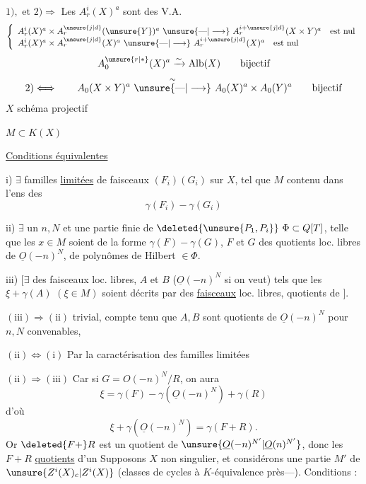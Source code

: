 $1),\text{ et }2)\Longrightarrow$ Les $A_r^i(X)^a$ sont des V.A.
\[
\left\{
\begin{array}{l}
A_r^i(X)^a\times A_r^{\unsure{j|d}}(\unsure{Y})^a\ \unsure{\text{---}|\longrightarrow}\ A_r^{i+\unsure{j|d}}(X\times Y)^a\quad\text{est nul}\\
A_r^i(X)^a\times A_r^{\unsure{j|d}}(X)^a\ \unsure{\text{---}|\longrightarrow}\ A_r^{i+\unsure{j|d}}(X)^a\quad\text{est nul}
\end{array}\right.
\]
\[
A_0^{\unsure{r|*}}(X)^a\xrightarrow{\sim}\operatorname{Alb}(X)\qquad\text{bijectif}
\]
\[
2)\Longleftrightarrow\qquad A_0(X\times Y)^a\ \overset{\sim}{\unsure{\text{---}|\longrightarrow}}\ A_0(X)^a\times A_0(Y)^a\qquad\text{bijectif}
\]
$X$ schéma projectif

$M\subset K(X)$

\uline{Conditions équivalentes}

i) $\exists$ familles \uline{limitées} de faisceaux  $(F_i)(G_i)$ sur $X$, tel que $M$ contenu dans l'ens des
\[
\gamma(F_i)-\gamma(G_i)
\]

ii) $\exists$ un $n,N$ et une partie finie de  $\deleted{\unsure{P_1,P_i}}\ \Phi\subset Q[T]$, telle que les $x\in M$ soient de la forme $\gamma(F)-\gamma(G)$, $F$ et $G$ des quotients loc. libres de $\underline{O}(-n)^N$, de polynômes de Hilbert $\in\Phi$.

iii) 
$[\exists$ des faisceaux loc. libres, $A$ et $B$ ($\underline{O}(-n)^N$ si on veut) tels que les $\xi+\gamma(A)$ $(\xi\in M)$ soient décrits par des \uline{faisceaux} loc. libres, quotients de   $]$.

$(\mathrm{iii})\Longrightarrow(\mathrm{ii})$ trivial, compte tenu que $A,B$ sont quotients de $\underline{O}(-n)^N$ pour $n,N$ convenables,

$(\mathrm{ii})\Longleftrightarrow(\mathrm{i})$ Par la caractérisation des familles limitées

$(\mathrm{ii})\Longrightarrow(\mathrm{iii})$ Car si $G=O(-n)^N/R$, on aura
\[
\xi=\gamma(F)-\gamma(\underline{O}(-n)^N)+\gamma(R)
\]
d'où
\[
\xi+\gamma(\underline{O}(-n)^N)=\gamma(F+R).
\]
Or $\deleted{F+}R$ est un quotient de $\unsure{\underline{O}(-n)^{N'}|\underline{O}(n)^{N'}}$, donc les $F+R$  \uline{quotients} d'un
Supposons  $X$ non singulier, et considérons  une partie $M'$ de $\unsure{Z^i(X)_c|Z^i(X)}$ (classes de cycles à $K$-équivalence près---).  Conditions  :

